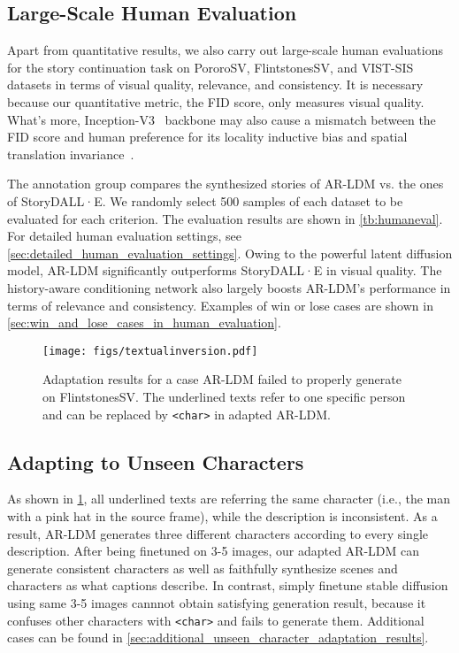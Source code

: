 \documentclass[10pt,twocolumn,letterpaper]{article}
\begin{document}
\subsection{Large-Scale Human Evaluation}
\label{sec:large_scale_human_evaluation}
Apart from quantitative results, we also carry out large-scale human evaluations for the story continuation task on PororoSV, FlintstonesSV, and VIST-SIS datasets in terms of visual quality, relevance, and consistency. It is necessary because our quantitative metric, the FID score, only measures visual quality. What's more, Inception-V3~\cite{inception} backbone may also cause a mismatch between the FID score and human preference for its locality inductive bias and spatial translation invariance~\cite{inductivebias}.


The annotation group compares the synthesized stories of AR-LDM vs. the ones of StoryDALL·E. We randomly select 500 samples of each dataset to be evaluated for each criterion. The evaluation results are shown in \cref{tb:humaneval}. For detailed human evaluation settings, see \cref{sec:detailed_human_evaluation_settings}. Owing to the powerful latent diffusion model, AR-LDM significantly outperforms StoryDALL·E in visual quality. The history-aware conditioning network also largely boosts AR-LDM's performance in terms of relevance and consistency. Examples of win or lose cases are shown in \cref{sec:win_and_lose_cases_in_human_evaluation}.


\begin{figure}[!t]
    \centering
    \texttt{[image: figs/textualinversion.pdf]}
    \caption{Adaptation results for a case AR-LDM failed to properly generate on FlintstonesSV. The underlined texts refer to one specific person and can be replaced by \texttt{<char>} in adapted AR-LDM.}
    \label{fig:textualinversion}
\end{figure}

\subsection{Adapting to Unseen Characters}
\label{sec:adapting_to_unseen_characters}
As shown in \cref{fig:textualinversion}, all underlined texts are referring the same character (i.e., the man with a pink hat in the source frame), while the description is inconsistent. As a result, AR-LDM generates three different characters according to every single description. After being finetuned on 3-5 images, our adapted AR-LDM can generate consistent characters as well as faithfully synthesize scenes and characters as what captions describe. In contrast, simply finetune stable diffusion using same 3-5 images cannnot obtain satisfying generation result, because it confuses other characters with \texttt{<char>} and fails to generate them. Additional cases can be found in \cref{sec:additional_unseen_character_adaptation_results}.
\end{document}
